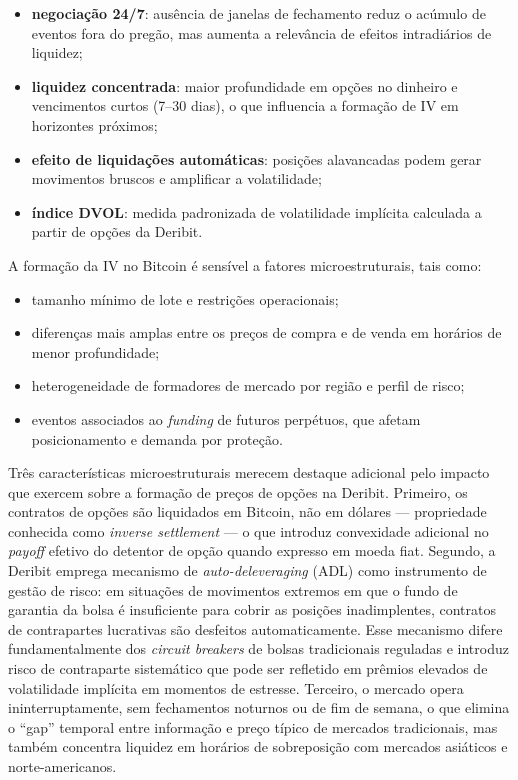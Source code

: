 \begin{itemize}
    \item \textbf{negociação 24/7}: ausência de janelas de fechamento reduz o
          acúmulo de eventos fora do pregão, mas aumenta a relevância de efeitos
          intradiários de liquidez;
    \item \textbf{liquidez concentrada}: maior profundidade em opções
          no dinheiro e vencimentos curtos (7--30 dias), o que influencia
          a formação de IV em horizontes próximos;
    \item \textbf{efeito de liquidações automáticas}: posições alavancadas podem
          gerar movimentos bruscos e amplificar a volatilidade;
    \item \textbf{índice DVOL}: medida padronizada de volatilidade implícita
          calculada a partir de opções da Deribit.
\end{itemize}

A formação da IV no Bitcoin é sensível a fatores microestruturais, tais como:

\begin{itemize}
    \item tamanho mínimo de lote e restrições operacionais;
    \item diferenças mais amplas entre os preços de compra e de venda em
          horários de menor profundidade;
    \item heterogeneidade de formadores de mercado por região e perfil de risco;
    \item eventos associados ao \textit{funding} de futuros perpétuos, que afetam
          posicionamento e demanda por proteção.
\end{itemize}

Três características microestruturais merecem destaque adicional pelo impacto que exercem sobre a formação de preços de opções na Deribit. Primeiro, os contratos de opções são liquidados em Bitcoin, não em dólares --- propriedade conhecida como \textit{inverse settlement} --- o que introduz convexidade adicional no \textit{payoff} efetivo do detentor de opção quando expresso em moeda fiat. Segundo, a Deribit emprega mecanismo de \textit{auto-deleveraging} (ADL) como instrumento de gestão de risco: em situações de movimentos extremos em que o fundo de garantia da bolsa é insuficiente para cobrir as posições inadimplentes, contratos de contrapartes lucrativas são desfeitos automaticamente. Esse mecanismo difere fundamentalmente dos \textit{circuit breakers} de bolsas tradicionais reguladas e introduz risco de contraparte sistemático que pode ser refletido em prêmios elevados de volatilidade implícita em momentos de estresse. Terceiro, o mercado opera ininterruptamente, sem fechamentos noturnos ou de fim de semana, o que elimina o ``gap'' temporal entre informação e preço típico de mercados tradicionais, mas também concentra liquidez em horários de sobreposição com mercados asiáticos e norte-americanos.

